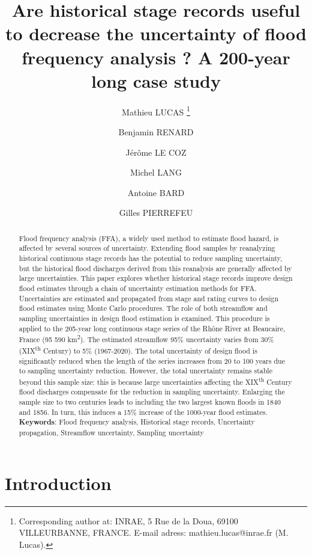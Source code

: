 \documentclass[11pt]{article}
\title{Are historical stage records useful to decrease the uncertainty of flood frequency analysis ? A 200-year long case study}
\author[1]{Mathieu LUCAS \thanks{Corresponding author at: INRAE, 5 Rue de la Doua, 69100 VILLEURBANNE, FRANCE. \newline E-mail adress: mathieu.lucas@inrae.fr (M. Lucas).}}
\author[2]{Benjamin RENARD}
\author[1]{Jérôme LE COZ}
\author[1]{Michel LANG}
\author[3]{Antoine BARD}
\author[4]{Gilles PIERREFEU}
\affil[1]{INRAE, UR RIVERLY, Villeurbanne, France}
\affil[2]{INRAE, UR RECOVER, Aix-en-Provence, France}
\affil[3]{ESDB, Briançon}
\affil[4]{CNR, Lyon}
\begin{document}
\maketitle

\begin{abstract}
    
    Flood frequency analysis (FFA), a widely used method to estimate flood hazard, is affected by several sources of uncertainty. Extending flood samples by reanalyzing historical continuous stage records has the potential to reduce sampling uncertainty, but the historical flood discharges derived from this reanalysis are generally affected by large uncertainties. This paper explores whether historical stage records improve design flood estimates through a chain of uncertainty estimation methods for FFA. Uncertainties are estimated and propagated from stage and rating curves to design flood estimates using Monte Carlo procedures. The role of both streamflow and sampling uncertainties in design flood estimation is examined. This procedure  is applied to the 205-year long continuous stage series of the Rhône River at Beaucaire, France (95 590 km\textsuperscript{2}). The estimated streamflow 95\% uncertainty varies from 30\% (XIX\textsuperscript{th} Century) to 5\% (1967-2020). The total uncertainty of design flood is significantly reduced when the length of the series increases from 20 to 100 years due to sampling uncertainty reduction. However, the total uncertainty remains stable beyond this sample size: this is because large uncertainties affecting the XIX\textsuperscript{th} Century flood discharges compensate for the reduction in sampling uncertainty. Enlarging the sample size to two centuries leads to including the two largest known floods in 1840 and 1856. In turn, this induces a 15\% increase of the 1000-year flood estimates.
    \newline
    \textbf{Keywords}: Flood frequency analysis, Historical stage records, Uncertainty propagation, Streamflow uncertainty, Sampling uncertainty
        
\end{abstract}

\section{Introduction}
\end{document}
